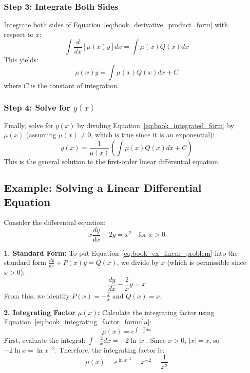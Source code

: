 \documentclass[12pt, letterpaper]{book}
\begin{document}
\subsubsection{Step 3: Integrate Both Sides}
Integrate both sides of Equation~\ref{eq:book_derivative_product_form} with respect to $x$:
\begin{equation}
    \int \frac{d}{dx}[\mu(x)y] dx = \int \mu(x)Q(x)dx
\end{equation}
This yields:
\begin{equation}
    \mu(x)y = \int \mu(x)Q(x)dx + C
    \label{eq:book_integrated_form}
\end{equation}
where $C$ is the constant of integration.

\subsubsection{Step 4: Solve for $y(x)$}
Finally, solve for $y(x)$ by dividing Equation~\ref{eq:book_integrated_form} by $\mu(x)$ (assuming $\mu(x) \neq 0$, which is true since it is an exponential):
\begin{equation}
    y(x) = \frac{1}{\mu(x)} \left( \int \mu(x)Q(x)dx + C \right)
    \label{eq:book_linear_de_solution}
\end{equation}
This is the general solution to the first-order linear differential equation.

\subsection{Example: Solving a Linear Differential Equation}
\label{ssec:book_example_linear_de}
Consider the differential equation:
\begin{equation}
    x\frac{dy}{dx} - 2y = x^2 \quad \text{for } x > 0
    \label{eq:book_ex_linear_problem}
\end{equation}

\textbf{1. Standard Form:}
To put Equation~\ref{eq:book_ex_linear_problem} into the standard form $\frac{dy}{dx} + P(x)y = Q(x)$, we divide by $x$ (which is permissible since $x > 0$):
\begin{equation}
    \frac{dy}{dx} - \frac{2}{x}y = x
    \label{eq:book_ex_linear_standard}
\end{equation}
From this, we identify $P(x) = -\frac{2}{x}$ and $Q(x) = x$.

\textbf{2. Integrating Factor $\mu(x)$:}
Calculate the integrating factor using Equation~\ref{eq:book_integrating_factor_formula}:
\begin{equation}
    \mu(x) = e^{\int -\frac{2}{x}dx}
\end{equation}
First, evaluate the integral: $\int -\frac{2}{x}dx = -2\ln|x|$. Since $x > 0$, $|x|=x$, so $-2\ln x = \ln x^{-2}$.
Therefore, the integrating factor is:
\begin{equation}
    \mu(x) = e^{\ln x^{-2}} = x^{-2} = \frac{1}{x^2}
\end{equation}
\end{document}
